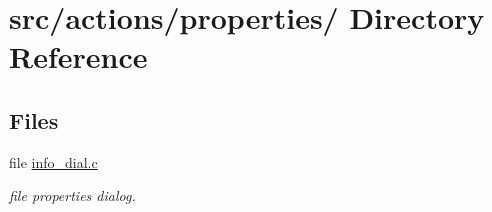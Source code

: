 \hypertarget{dir_000030}{
\section{src/actions/properties/ Directory Reference}
\label{dir_000030}
}
\subsection*{Files}
\begin{CompactItemize}
\item 
file \hyperlink{info__dial_8c}{info\_\-dial.c}
\begin{CompactList}\small\item\em file properties dialog. \item\end{CompactList}

\end{CompactItemize}
